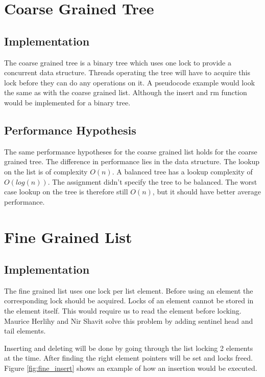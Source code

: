 \documentclass[10pt,a4paper]{article}
\begin{document}
\section{Coarse Grained Tree} \subsection{Implementation} The coarse grained
tree is a binary tree which uses one lock to provide a concurrent data
structure. Threads operating the tree will have to acquire this lock before
they can do any operations on it. A pseudocode example would look the same as
with the coarse grained list. Although the insert and rm function would be
implemented for a binary tree.

\subsection{Performance Hypothesis} The same performance hypotheses for the
coarse grained list holds for the coarse grained tree. The difference in
performance lies in the data structure. The lookup on the list is of complexity
$O(n)$. A balanced tree has a lookup complexity of $O(log(n))$. The assignment
didn't specify the tree to be balanced. The worst case lookup on the tree is
therefore still $O(n)$, but it should have better average performance.

\section{Fine Grained List} 
\subsection{Implementation}
The fine grained list uses one lock per list element. Before using an element the corresponding lock should be acquired.
Locks of an element cannot be stored in the element itself. This would require us to read the element
before locking. Maurice Herlihy and Nir Shavit solve this problem by adding sentinel head and tail elements.

Inserting and deleting will be done by going through the list locking 2 elements at the time. 
After finding the right element pointers will be set and locks freed. Figure \ref{fig:fine_insert} shows an
example of how an insertion would be executed.
\end{document}
